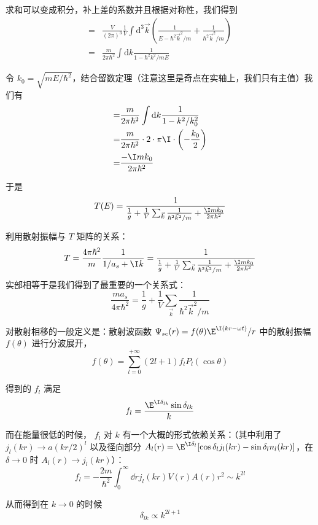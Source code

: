 求和可以变成积分，补上差的系数并且根据对称性，我们得到
\begin{equation}
\begin{split}
=&\frac{V}{(2\pi)^3}\frac{1}{V}\int\text{d}^3{\vec k}\left(\frac{1}{E-\hbar^2{\vec k}^2/m} + \frac{1}{\hbar^2{\vec k}^2/m}\right)\\
=&\frac{m}{2\pi\hbar^2}\int\text{d}k\frac{1}{1-\hbar^2k^2/mE} 
\end{split}
\end{equation}

令 $k_0 = \sqrt{mE/\hbar^2}$，结合留数定理（注意这里是奇点在实轴上，我们只有主值）我们有
\begin{equation}
\begin{split}
=&\frac{m}{2\pi\hbar^2}\int\text{d}k\frac{1}{1-k^2/k_0^2} \\
=&\frac{m}{2\pi\hbar^2}\cdot 2\cdot \pi \I \cdot \left(-\frac{k_0}{2}\right)\\
=&\frac{-\I mk_0}{2\pi\hbar^2}
\end{split}
\end{equation}

于是
\begin{equation}
T(E) = \dfrac{1}{\frac{1}{g} + \frac{1}{V}\sum_{\vec k}\frac{1}{\hbar^2{\vec k}^2/m} + \frac{\I mk_0}{2\pi\hbar^2}}
\end{equation}

利用散射振幅与 $T$ 矩阵的关系：
\begin{equation}
T=\frac{4\pi\hbar^2}{m}\frac{1}{1/a_s + \I k} = \dfrac{1}{\frac{1}{g} + \frac{1}{V}\sum_{\vec k}\frac{1}{\hbar^2{\vec k}^2/m} + \frac{\I mk_0}{2\pi\hbar^2}}
\end{equation}
实部相等于是我们得到了最重要的一个关系式：
\begin{equation}\label{TwoAtF_eq38}
\frac{ma_s}{4\pi\hbar^2} = \frac{1}{g} + \frac{1}{V}\sum_{\vec k}\frac{1}{\hbar^2{\vec k}^2/m}
\end{equation}

对散射相移的一般定义是：散射波函数 $\Psi_{sc}(r) = f(\theta) \E^{\I (kr-\omega t)}/r$ 中的散射振幅 $f(\theta)$ 进行分波展开，
\begin{equation}
f(\theta) = \sum_{l=0}^{+\infty} (2l+1) f_l P_l(\cos\theta)
\end{equation}

得到的 $f_l$ 满足
\begin{equation}
f_l = \frac{\E^{\I\delta_{lk}}\sin\delta_{lk}}{k}
\end{equation}

而在能量很低的时候， $f_l$ 对 $k$ 有一个大概的形式依赖关系：（其中利用了 $j_l(kr)\to a(kr/2)^l$ 以及径向部分 $A_l(r) = \E^{\I\delta_l}[\cos\delta_l j_l(kr) -  \sin\delta_l n_l(kr)]$，在 $\delta\to0$ 时 $A_l(r)\to j_l(kr)$）：
\begin{equation}
f_l = -\frac{2m}{\hbar^2}\int_0^{\infty} \dd{r} j_l(kr)V(r)A(r)r^2 \sim k^{2l}
\end{equation}

从而得到在 $k\to0$ 的时候
\begin{equation}
\delta_{lk}\propto k^{2l+1}
\end{equation}
